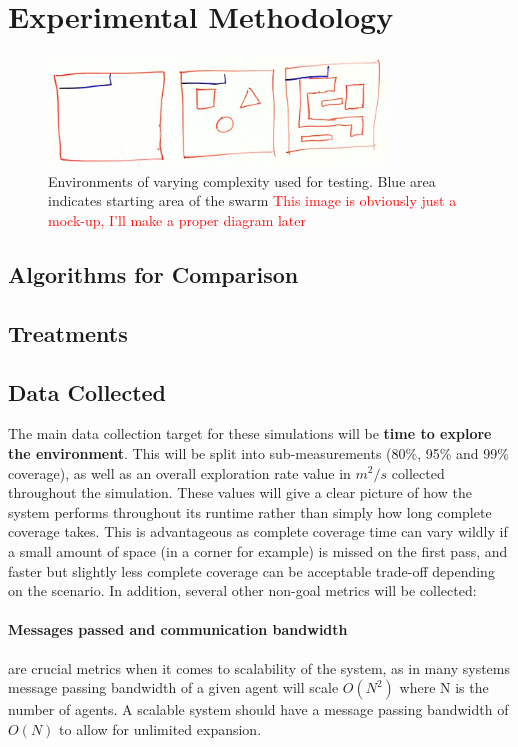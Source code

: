 \documentclass[runningheads]{llncs}
\newcommand\incomplete[1]{\textcolor{red}{#1}}
\begin{document}
\pagebreak
\section{Experimental Methodology}
\begin{figure}[h]
    \centering
    \includegraphics[width=0.8\textwidth]{Images/Example Environments.jpg}
    \caption{Environments of varying complexity used for testing. Blue area indicates starting area of the swarm \incomplete{This image is obviously just a mock-up, I'll make a proper diagram later}}
    \label{fig:example environments}
    \end{figure}

\subsection{Algorithms for Comparison}



\subsection{Treatments}

\subsection{Data Collected}
The main data collection target for these simulations will be \textbf{time to explore the environment}. This will be split into sub-measurements (80\%, 95\% and 99\% coverage), as well as an overall exploration rate value in $m^2/s$ collected throughout the simulation. These values will give a clear picture of how the system performs throughout its runtime rather than simply how long complete coverage takes. This is advantageous as complete coverage time can vary wildly if a small amount of space (in a corner for example) is missed on the first pass, and faster but slightly less complete coverage can be acceptable trade-off depending on the scenario. In addition, several other non-goal metrics will be collected:

\paragraph{Messages passed and communication bandwidth} are crucial metrics when it comes to scalability of the system, as in many systems message passing bandwidth of a given agent will scale $O(N^2)$ where N is the number of agents. A scalable system should have a message passing bandwidth of $O(N)$ to allow for unlimited expansion.
\end{document}
